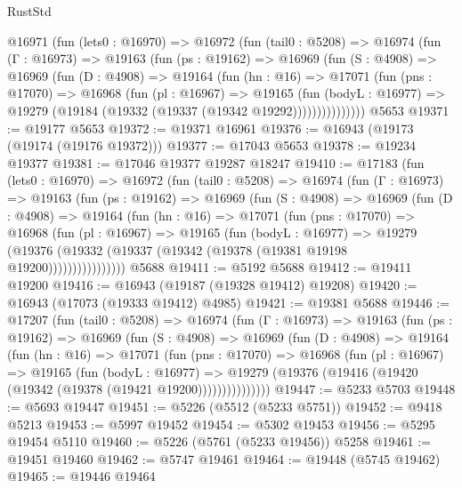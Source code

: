 \begin{lexlean}{RustStd}
\begin{coremodule}
    @16971
      (fun (lets0 : @16970) =>
      @16972
        (fun (tail0 : @5208) =>
        @16974
          (fun (Γ : @16973) =>
          @19163
            (fun (ps : @19162) =>
            @16969
              (fun (S : @4908) =>
              @16969
                (fun (D : @4908) =>
                @19164
                  (fun (hn : @16) =>
                  @17071
                    (fun (pns : @17070) =>
                    @16968
                      (fun (pl : @16967) =>
                      @19165
                        (fun (bodyL : @16977) =>
                        @19279 (@19184 (@19332 (@19337 (@19342 @19292)))))))))))))))
    @5653
@19371 := @19177 @5653
@19372 := @19371 @16961
@19376 := @16943 (@19173 (@19174 (@19176 @19372)))
@19377 := @17043 @5653
@19378 := @19234 @19377
@19381 := @17046 @19377 @19287 @18247
@19410 := @17183
    (fun (lets0 : @16970) =>
    @16972
      (fun (tail0 : @5208) =>
      @16974
        (fun (Γ : @16973) =>
        @19163
          (fun (ps : @19162) =>
          @16969
            (fun (S : @4908) =>
            @16969
              (fun (D : @4908) =>
              @19164
                (fun (hn : @16) =>
                @17071
                  (fun (pns : @17070) =>
                  @16968
                    (fun (pl : @16967) =>
                    @19165
                      (fun (bodyL : @16977) =>
                      @19279
                        (@19376
                          (@19332 (@19337 (@19342 (@19378 (@19381 @19198 @19200))))))))))))))))
    @5688
@19411 := @5192 @5688
@19412 := @19411 @19200
@19416 := @16943 (@19187 (@19328 @19412) @19208)
@19420 := @16943 (@17073 (@19333 @19412) @4985)
@19421 := @19381 @5688
@19446 := @17207
    (fun (tail0 : @5208) =>
    @16974
      (fun (Γ : @16973) =>
      @19163
        (fun (ps : @19162) =>
        @16969
          (fun (S : @4908) =>
          @16969
            (fun (D : @4908) =>
            @19164
              (fun (hn : @16) =>
              @17071
                (fun (pns : @17070) =>
                @16968
                  (fun (pl : @16967) =>
                  @19165
                    (fun (bodyL : @16977) =>
                    @19279 (@19376 (@19416 (@19420 (@19342 (@19378 (@19421 @19200)))))))))))))))
@19447 := @5233 @5703
@19448 := @5693 @19447
@19451 := @5226 (@5512 (@5233 @5751))
@19452 := @9418 @5213
@19453 := @5997 @19452
@19454 := @5302 @19453
@19456 := @5295 @19454 @5110
@19460 := @5226 (@5761 (@5233 @19456)) @5258
@19461 := @19451 @19460
@19462 := @5747 @19461
@19464 := @19448 (@5745 @19462)
@19465 := @19446 @19464

\end{coremodule}
\end{lexlean}
